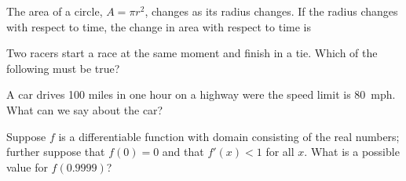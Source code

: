 \documentclass{ximera}
\newcommand{\recommendation}[1]{}
\newcommand{\GoodQuestions}[1]{}
\begin{document}
\begin{problem}
  \recommendation{Vic}
  \GoodQuestions{Subject: Derivative Rules 20P}
  The area of a circle, $A=\pi r^2$, changes as its radius changes. If
  the radius changes with respect to time, the change in area with
  respect to time is
  \begin{multipleChoice}
  \end{multipleChoice}
\end{problem}



\begin{problem}
  \recommendation{Vic}
  \GoodQuestions{Subject: Mean Value Theorem and shapes of curves 9D}

  Two racers start a race at the same moment and finish in a tie.
  Which of the following must be true?
  \begin{multipleChoice}
  \end{multipleChoice}
\end{problem}


\begin{problem}
  \recommendation{Elizabeth}
  A car drives 100 miles in one hour on a highway were the speed limit
  is 80~mph.  What can we say about the car?
  \begin{multipleChoice}
  \end{multipleChoice}
\end{problem}

\begin{problem}
  Suppose $f$ is a differentiable function with domain consisting of
  the real numbers; further suppose that $f(0) = 0$ and that $f'(x) <
  1$ for all $x$.  What is a possible value for $f(0.9999)$?
  \begin{multipleChoice}
  \end{multipleChoice}
\end{problem}
\end{document}
